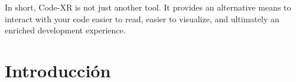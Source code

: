 \documentclass[a4paper, 12pt]{book}
\begin{document}
In short, Code-XR is not just another tool. It provides an alternative means to interact with your code easier to read, easier to visualize, and ultimately an enriched development experience.



\tableofcontents 
\cleardoublepage
\listoffigures %



\cleardoublepage
\chapter{Introducción}
\label{sec:intro} %




\end{document}
